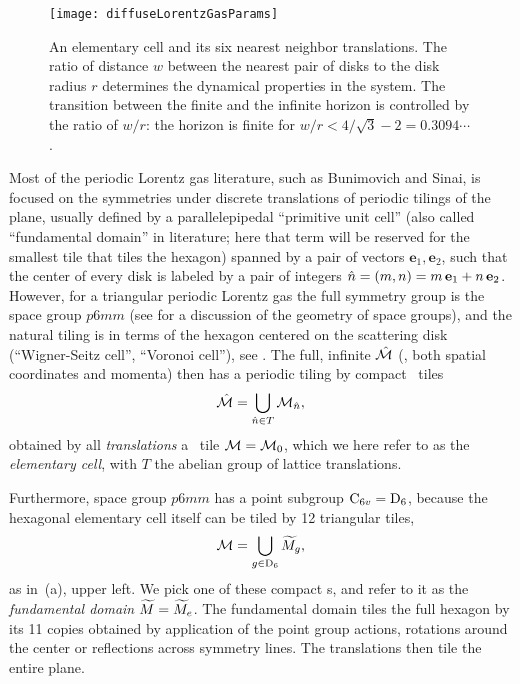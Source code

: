 

\begin{figure}[htbp]
	\begin{center}
    \texttt{[image: diffuseLorentzGasParams]}
	\end{center}
	\caption[]{\label{fig-LorentzGasParams}
    An elementary cell and its six nearest neighbor translations. The ratio of
    distance $w$ between the nearest pair of disks to the disk radius $r$
    determines the dynamical properties in the system. The transition
    between the finite and the infinite horizon is controlled by the
    ratio of $w/r$: the horizon is finite for $w/r < 4/\sqrt{3}-2
    =0.3094\cdots$.
	}
\end{figure}

Most of the periodic Lorentz gas literature, such as Bunimovich and
Sinai, is focused on the symmetries under discrete
translations of periodic tilings of the plane, usually defined by a
parallelepipedal ``primitive unit cell''
(also called ``fundamental domain'' in literature; here that term will
be reserved for the smallest tile that tiles the hexagon)
spanned by a pair of vectors
$\textbf{e}_1,\textbf{e}_2$, such that the center of every disk is
labeled by a pair of integers
$\hat{n}=(m,n)=m\,\textbf{e}_1+n\,\textbf{e}_2$.
However, for a triangular periodic Lorentz gas the full symmetry group is
the space group $p6mm$ (see  for a discussion of the
geometry of space groups), and the natural tiling is in terms of the
hexagon centered on the scattering disk (``Wigner-Seitz cell'', ``Voronoi
cell''),  see .
The full, infinite {\statesp} $\hat {{\cal M}}$ (\ie, both spatial coordinates and
momenta) then has a periodic tiling by compact \statesp\ tiles
\[ %
\hM=\bigcup_{ \hn \in T} \pS_{\hn},
\] %
obtained by all {\em translations} a \statesp\ tile ${\cal M}={\cal M}_{0}$, which
we here refer to as the {\em elementary cell}, with $T$ the abelian group
of lattice translations.

Furthermore, space group $p6mm$ has a point subgroup $\textrm{C}_{6v}=\textrm{D}_{6}$,
because the hexagonal elementary cell itself can be tiled by 12
triangular tiles,
\[ %
\pS=\bigcup_{\LieEl \in \Dn{6}} \tM_\LieEl,
\] %
as in \,(a), upper left. We pick one of these
compact \statesp s, and refer to it as the
\emph{fundamental domain} ${\widetilde M}={\widetilde M}_e$. The fundamental domain tiles the
full hexagon by its 11 copies obtained by application of the  point
group actions, rotations around the center or reflections across symmetry
lines. The translations then tile the entire plane.

